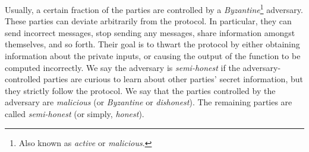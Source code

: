 \documentclass[11pt]{article}
\theoremstyle{plain}
\begin{document}
Usually, a certain fraction of the parties are controlled by a \textit{Byzantine}\footnote{Also known as \emph{active} or \emph{malicious}.}
adversary. These parties can deviate arbitrarily from the protocol.
In particular, they can send incorrect messages, stop sending any
messages, share information amongst themselves, and so forth. Their
goal is to thwart the protocol by either obtaining information about
the private inputs, or causing the output of the function to be computed
incorrectly. We say the adversary is \emph{semi-honest} if the adversary-controlled
parties are curious to learn about other parties' secret information,
but they strictly follow the protocol. We say that the parties controlled
by the adversary are \emph{malicious} (or \emph{Byzantine} or \emph{dishonest}).
The remaining parties are called \emph{semi-honest} (or simply, \emph{honest}).
\end{document}
